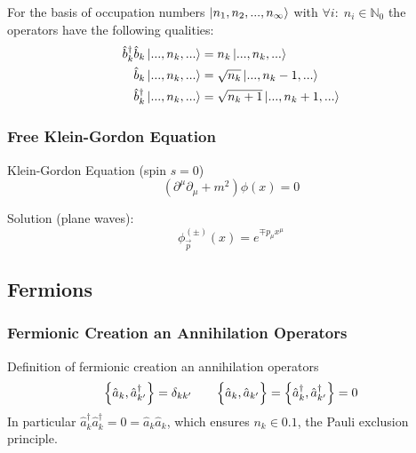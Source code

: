 			\noindent
			For the basis of occupation numbers $\Ket{n_1, n_2, ..., n_\infty}$ with $\forall i:\;n_i\in \mathbb{N}_0$ the operators have the following qualities:
			\begin{equation}
				\begin{aligned}
					\hat{b}_k^\dagger \hat{b}_k \Ket{...,n_k,...} &= n_k \Ket{...,n_k,...} \\
					\hat{b}_k \Ket{...,n_k,...} &= \sqrt{n_k} \Ket{...,n_k-1,...} \\
					\hat{b}_k^\dagger \Ket{...,n_k,...} &= \sqrt{n_k+1} \Ket{...,n_k+1,...} \\
				\end{aligned}
			\end{equation}

		\subsubsection{Free Klein-Gordon Equation}
			\noindent
			Klein-Gordon Equation (spin $s=0$)
			\begin{equation}
				\left(\partial^\mu\partial_\mu+m^2\right) \phi(x) = 0
			\end{equation}

			\noindent
			Solution (plane waves):
			\begin{equation}
				{\phi}^{ ( \pm ) }_{\vec{p}} (x) = e^{\mp p_\mu x^\mu}
			\end{equation}

	\subsection{Fermions}
		\subsubsection{Fermionic Creation an Annihilation Operators}
		\label{Sec:FermionicCreationAndAnnihilationOperators}
			Definition of fermionic creation an annihilation operators
			\begin{equation}
				\acomm{\hat{a}_k}{\hat{a}_{k'}^\dagger} = \delta_{kk'}
				\hspace{20pt}
				\Big\lbrace\hat{a}_k,\hat{a}_{k'}\Big\rbrace = \acomm{\hat{a}_k^\dagger}{\hat{a}_{k'}^\dagger} = 0
			\end{equation}
			In particular $\hat{a}_k^\dagger \hat{a}_k^\dagger = 0 = \hat{a}_k \hat{a}_k$, which ensures $n_k\in\qty{0,1}$, \ie the Pauli exclusion principle.

